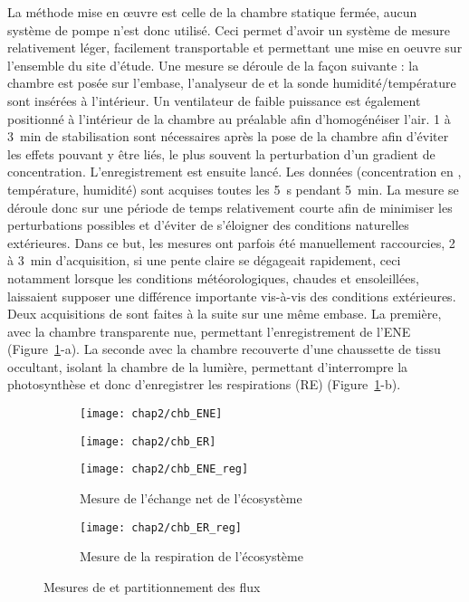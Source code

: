 La méthode mise en œuvre est celle de la chambre statique fermée, aucun système de pompe n'est donc utilisé.
Ceci permet d'avoir un système de mesure relativement léger, facilement transportable et permettant une mise en oeuvre sur l'ensemble du site d'étude.
Une mesure se déroule de la façon suivante :
la chambre est posée sur l'embase, l'analyseur de \coo et la sonde humidité/température sont insérées à l'intérieur.
Un ventilateur de faible puissance est également positionné à l'intérieur de la chambre au préalable afin d'homogénéiser l'air.
1 à \SI{3}{\minute} de stabilisation sont nécessaires après la pose de la chambre afin d'éviter les effets pouvant y être liés, le plus souvent la perturbation d'un gradient de concentration.
L’enregistrement est ensuite lancé.
Les données (concentration en \coo, température, humidité) sont acquises toutes les \SI{5}{\second} pendant \SI{5}{\minute}.
La mesure se déroule donc sur une période de temps relativement courte afin de minimiser les perturbations possibles et d'éviter de s'éloigner des conditions naturelles extérieures.
Dans ce but, les mesures ont parfois été manuellement raccourcies, 2 à \SI{3}{\minute} d'acquisition, si une pente claire se dégageait rapidement, ceci notamment lorsque les conditions météorologiques, chaudes et ensoleillées, laissaient supposer une différence importante vis-à-vis des conditions extérieures.
Deux acquisitions de \coo sont faites à la suite sur une même embase.
La première, avec la chambre transparente nue, permettant l'enregistrement de l'ENE (Figure~\ref{fig:chb}-a).
La seconde avec la chambre recouverte d'une chaussette de tissu occultant, isolant la chambre de la lumière, permettant d'interrompre la photosynthèse et donc d'enregistrer les respirations (RE) (Figure~\ref{fig:chb}-b).

\begin{figure}
	\centering
	\begin{subfigure}[t]{0.5\textwidth}
		\centering
		\texttt{[image: chap2/chb\_ENE]}
	\end{subfigure}%
	\begin{subfigure}[t]{0.5\textwidth}
		\centering
		\texttt{[image: chap2/chb\_ER]}
	\end{subfigure}%

	\begin{subfigure}[t]{0.5\textwidth}
		\texttt{[image: chap2/chb\_ENE\_reg]}
		\caption{Mesure de l'échange net de l'écosystème}
	\end{subfigure}%
	\begin{subfigure}[t]{0.5\textwidth}
		\texttt{[image: chap2/chb\_ER\_reg]}
		\caption{Mesure de la respiration de l'écosystème}
	\end{subfigure}
\caption{Mesures de \coo et partitionnement des flux}
\label{fig:chb}
\end{figure}

